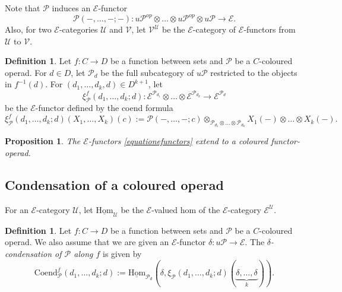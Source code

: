 \documentclass[]{amsart}
\newtheorem{proposition}[theorem]{Proposition}
\theoremstyle{definition}
\newtheorem{definition}[theorem]{Definition}
\begin{document}
Note that $\mathcal{P}$ induces an $\mathcal{E}$-functor
\begin{equation}
	\mathcal{P}(-,\ldots,-;-): u\mathcal{P}^{op} \otimes \ldots \otimes u\mathcal{P}^{op} \otimes u\mathcal{P} \to \mathcal{E}.
\end{equation}
Also, for two $\mathcal{E}$-categories $\mathcal{U}$ and $\mathcal{V}$, let $\mathcal{V}^\mathcal{U}$ be the $\mathcal{E}$-category of $\mathcal{E}$-functors from $\mathcal{U}$ to $\mathcal{V}$.

\begin{definition}\cite[Section 1.7]{BataninBergerLattice}\label{definitionrealization}
	Let $f: C \to D$ be a function between sets and $\mathcal{P}$ be a $C$-coloured operad. For $d \in D$, let $\mathcal{P}_d$ be the full subcategory of $u\mathcal{P}$ restricted to the objects in $f^{-1}(d)$. For $(d_1,\ldots,d_k,d) \in D^{k+1}$, let
	\begin{equation}\label{equationefunctors}
	\xi_\mathcal{P}^f(d_1,\ldots,d_k;d): \mathcal{E}^{\mathcal{P}_{d_1}} \otimes \ldots \otimes \mathcal{E}^{\mathcal{P}_{d_k}} \to \mathcal{E}^{\mathcal{P}_d}
	\end{equation}
	be the $\mathcal{E}$-functor defined by the coend formula
	\[
	\xi_\mathcal{P}^f(d_1,\ldots,d_k;d)(X_1,\ldots,X_k)(c) := \mathcal{P}(-,\ldots,-;c) \otimes_{\mathcal{P}_{d_1} \otimes \ldots \otimes \mathcal{P}_{d_k}} X_1(-) \otimes \ldots \otimes X_k(-).
	\]
\end{definition}



\begin{proposition}\cite[Proposition 1.8]{BataninBergerLattice}
	The $\mathcal{E}$-functors \eqref{equationefunctors} extend to a coloured functor-operad.
\end{proposition}



\subsection{Condensation of a coloured operad}


For an $\mathcal{E}$-category $\mathcal{U}$, let $\underline{\mathrm{Hom}}_\mathcal{U}$ be the $\mathcal{E}$-valued hom of the $\mathcal{E}$-category $\mathcal{E}^\mathcal{U}$.

\begin{definition}
	Let $f: C \to D$ be a function between sets and $\mathcal{P}$ be a $C$-coloured operad. We also assume that we are given an $\mathcal{E}$-functor $\delta: u\mathcal{P} \to \mathcal{E}$. The \emph{$\delta$-condensation of $\mathcal{P}$ along $f$} is given by
	\[
	\mathrm{Coend}_\mathcal{P}^f(d_1,\ldots,d_k;d) := \underline{\mathrm{Hom}}_{\mathcal{P}_d}(\delta,\xi_\mathcal{P}(d_1,\ldots,d_k;d)(\underbrace{\delta,\ldots,\delta}_k)).
	\]
\end{definition}
\end{document}
